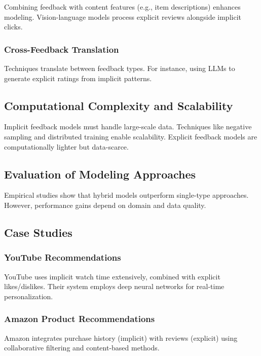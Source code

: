Combining feedback with content features (e.g., item descriptions) enhances modeling. Vision-language models process explicit reviews alongside implicit clicks.

\subsubsection{Cross-Feedback Translation}

Techniques translate between feedback types. For instance, using LLMs to generate explicit ratings from implicit patterns.

\subsection{Computational Complexity and Scalability}

Implicit feedback models must handle large-scale data. Techniques like negative sampling and distributed training enable scalability. Explicit feedback models are computationally lighter but data-scarce.

\subsection{Evaluation of Modeling Approaches}

Empirical studies show that hybrid models outperform single-type approaches. However, performance gains depend on domain and data quality.

\subsection{Case Studies}

\subsubsection{YouTube Recommendations}

YouTube uses implicit watch time extensively, combined with explicit likes/dislikes. Their system employs deep neural networks for real-time personalization.

\subsubsection{Amazon Product Recommendations}

Amazon integrates purchase history (implicit) with reviews (explicit) using collaborative filtering and content-based methods.


